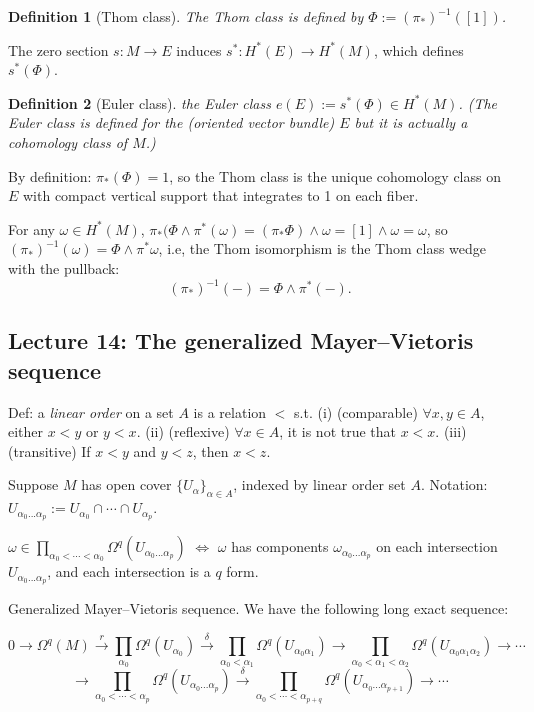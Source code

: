 \documentclass{article}
\theoremstyle{mystyle}
\newtheorem*{definition}{Definition}%
\theoremstyle{remark}
\numberwithin{equation}{section}
\begin{document}
\begin{definition}[Thom class] The \emph{Thom class} is defined by $\Phi:=(\pi_*)^{-1}([1])$. 
\end{definition}

The zero section $s\colon M\rightarrow E$ induces $s^*\colon H^*(E)\rightarrow H^*(M)$, which defines $s^*(\Phi)$.

\begin{definition}[Euler class] the \emph{Euler class} $e(E) := s^*(\Phi) \in H^*(M)$. (The Euler class is defined for the (oriented vector bundle) $E$ but it is actually a cohomology class of $M$.)
\end{definition}

By definition: $\pi_*(\Phi) = 1$, so the Thom class is the unique cohomology class on $E$ with compact vertical support that integrates to 1 on each fiber.

For any $\omega \in H^*(M)$, $\pi_*(\Phi\wedge \pi^*(\omega) = (\pi_*\Phi)\wedge \omega = [1]\wedge \omega = \omega$, so $(\pi_*)^{-1}(\omega) = \Phi \wedge \pi^*\omega$, i.e, the Thom isomorphism is the Thom class wedge with the pullback:
$$(\pi_*)^{-1}(-) = \Phi\wedge \pi^*(-).$$

\subsection{Lecture 14: The generalized Mayer--Vietoris sequence}

Def: a \emph{linear order} on a set $A$ is a relation $<$ s.t. (i) (comparable) $\forall x,y\in A$, either $x<y$ or $y<x$. (ii) (reflexive) $\forall x \in A$, it is not true that $x<x$. (iii) (transitive) If $x<y$ and $y<z$, then $x<z$.

Suppose $M$ has open cover $\{U_\alpha\}_{\alpha \in A}$, indexed by linear order set $A$. Notation: $U_{\alpha_0...\alpha_p} := U_{\alpha_0}\cap \cdots \cap U_{\alpha_p}$.

$\omega \in\prod_{\alpha_0<\cdots <\alpha_0}
\Omega^q(U_{\alpha_0...\alpha_p})$ $\Leftrightarrow$ $\omega$ has components $\omega_{\alpha_0...\alpha_p}$ on each intersection $U_{\alpha_0...\alpha_p}$, and each intersection is a $q$ form.

Generalized Mayer--Vietoris sequence. We have the following long exact sequence:

$$0\rightarrow \Omega^q(M)\xrightarrow{r} \prod_{\alpha_0} \Omega^q(U_{\alpha_0}) \xrightarrow{\delta}
\prod_{\alpha_0<\alpha_1}\Omega^q(U_{\alpha_0\alpha_1})\rightarrow
\prod_{\alpha_0<\alpha_1<\alpha_2}
\Omega^q(U_{\alpha_0\alpha_1\alpha_2})\rightarrow\cdots $$
$$\rightarrow \prod_{\alpha_0<\cdots<\alpha_p}\Omega^q(U_{\alpha_0...\alpha_p})\xrightarrow{\delta}
\prod_{\alpha_0<\cdots<\alpha_{p+q}}\Omega^q(U_{\alpha_0...\alpha_{p+1}})\rightarrow \cdots$$
\end{document}
